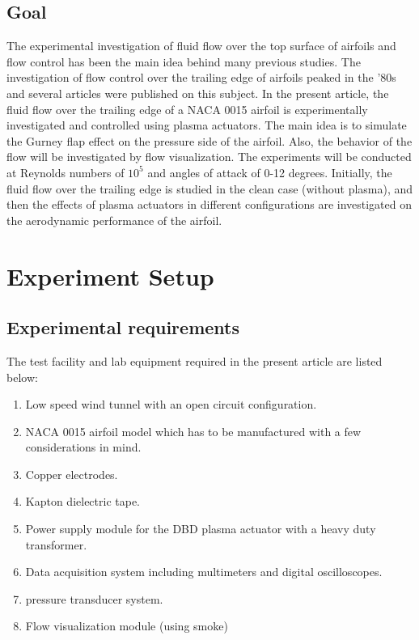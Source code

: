 \documentclass[fleqn,10pt]{SelfArx} %
\begin{document}
\subsection{Goal}
The experimental investigation of fluid flow over the top surface of airfoils and flow control has been the main idea behind many previous studies. The investigation of flow control over the trailing edge of airfoils peaked in the '80s and several articles were published on this subject. In the present article, the fluid flow over the trailing edge of a NACA 0015 airfoil is experimentally investigated and controlled using plasma actuators. The main idea is to simulate the Gurney flap effect on the pressure side of the airfoil. Also, the behavior of the flow will be investigated by flow visualization. The experiments will be conducted at Reynolds numbers of $10^5$ and angles of attack of 0-12 degrees. Initially, the fluid flow over the trailing edge is studied in the clean case (without plasma), and then the effects of plasma actuators in different configurations are investigated on the aerodynamic performance of the airfoil.



\section{Experiment Setup}

\subsection{Experimental requirements}
The test facility and lab equipment required in the present article are listed below:
\begin{enumerate}
\item Low speed wind tunnel with an open circuit configuration.
\item NACA 0015 airfoil model which has to be manufactured with a few considerations in mind.
\item Copper electrodes.
\item Kapton dielectric tape.
\item Power supply module for the DBD plasma actuator with a heavy duty transformer.
\item Data acquisition system including multimeters and digital oscilloscopes.
\item pressure transducer system.
\item Flow visualization module (using smoke)
\end{enumerate}
\end{document}
